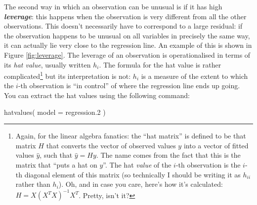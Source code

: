 \documentclass[
]{book}
\newenvironment{Shaded}{\begin{snugshade}}{\end{snugshade}}
\newcommand{\AttributeTok}[1]{\textcolor[rgb]{0.77,0.63,0.00}{#1}}
\newcommand{\FloatTok}[1]{\textcolor[rgb]{0.00,0.00,0.81}{#1}}
\newcommand{\FunctionTok}[1]{\textcolor[rgb]{0.00,0.00,0.00}{#1}}
\newcommand{\NormalTok}[1]{#1}
\begin{document}
The second way in which an observation can be unusual is if it has high \textbf{\emph{leverage}}: this happens when the observation is very different from all the other observations. This doesn't necessarily have to correspond to a large residual: if the observation happens to be unusual on all variables in precisely the same way, it can actually lie very close to the regression line. An example of this is shown in Figure \ref{fig:leverage}. The leverage of an observation is operationalised in terms of its \emph{hat value}, usually written \(h_i\). The formula for the hat value is rather complicated\footnote{Again, for the linear algebra fanatics: the ``hat matrix'' is defined to be that matrix \(H\) that converts the vector of observed values \(y\) into a vector of fitted values \(\hat{y}\), such that \(\hat{y} = H y\). The name comes from the fact that this is the matrix that ``puts a hat on \(y\)''. The hat \emph{value} of the \(i\)-th observation is the \(i\)-th diagonal element of this matrix (so technically I should be writing it as \(h_{ii}\) rather than \(h_{i}\)). Oh, and in case you care, here's how it's calculated: \(H = X(X^TX)^{-1} X^T\). Pretty, isn't it?} but its interpretation is not: \(h_i\) is a measure of the extent to which the \(i\)-th observation is ``in control'' of where the regression line ends up going. You can extract the hat values using the following command:

\begin{Shaded}
\begin{Highlighting}[]
\FunctionTok{hatvalues}\NormalTok{( }\AttributeTok{model =}\NormalTok{ regression}\FloatTok{.2}\NormalTok{ )}
\end{Highlighting}
\end{Shaded}
\end{document}

